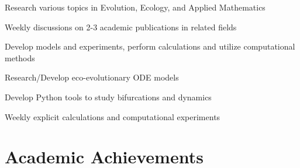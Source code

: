 \documentclass[letterpaper]{deedy-resume} %
\begin{document}
\begin{minipage}[t]{0.66\textwidth}
\begin{tightitemize}
\item Research various topics in Evolution, Ecology, and Applied Mathematics
\item Weekly discussions on 2-3 academic publications in related fields
\item Develop models and experiments, perform calculations and utilize computational methods
\end{tightitemize}
\sectionspace


\begin{tightitemize}
\item Research/Develop eco-evolutionary ODE models
\item Develop Python tools to study bifurcations and dynamics
\item Weekly explicit calculations and computational experiments
\end{tightitemize}
\sectionspace %









\section{Academic Achievements}

\end{minipage}
\end{document}
